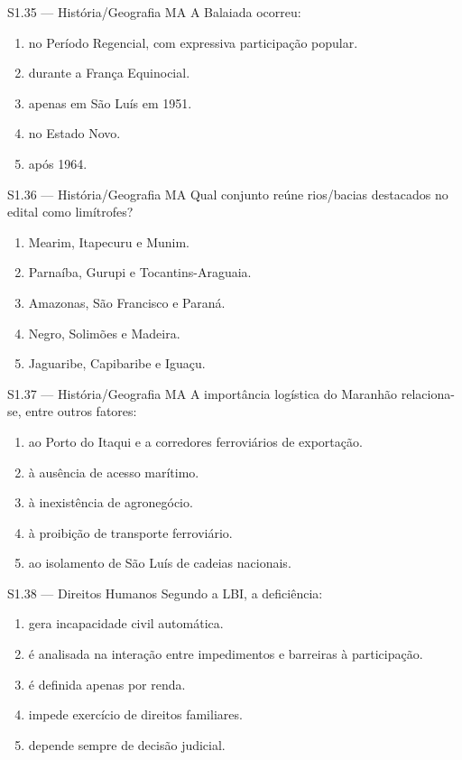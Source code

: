 \begin{questao}{S1.35 — História/Geografia MA}
A Balaiada ocorreu:
\begin{enumerate}[label=\Alph*)]
\item no Período Regencial, com expressiva participação popular.
\item durante a França Equinocial.
\item apenas em São Luís em 1951.
\item no Estado Novo.
\item após 1964.
\end{enumerate}
\end{questao}

\begin{questao}{S1.36 — História/Geografia MA}
Qual conjunto reúne rios/bacias destacados no edital como limítrofes?
\begin{enumerate}[label=\Alph*)]
\item Mearim, Itapecuru e Munim.
\item Parnaíba, Gurupi e Tocantins-Araguaia.
\item Amazonas, São Francisco e Paraná.
\item Negro, Solimões e Madeira.
\item Jaguaribe, Capibaribe e Iguaçu.
\end{enumerate}
\end{questao}

\begin{questao}{S1.37 — História/Geografia MA}
A importância logística do Maranhão relaciona-se, entre outros fatores:
\begin{enumerate}[label=\Alph*)]
\item ao Porto do Itaqui e a corredores ferroviários de exportação.
\item à ausência de acesso marítimo.
\item à inexistência de agronegócio.
\item à proibição de transporte ferroviário.
\item ao isolamento de São Luís de cadeias nacionais.
\end{enumerate}
\end{questao}

\begin{questao}{S1.38 — Direitos Humanos}
Segundo a LBI, a deficiência:
\begin{enumerate}[label=\Alph*)]
\item gera incapacidade civil automática.
\item é analisada na interação entre impedimentos e barreiras à participação.
\item é definida apenas por renda.
\item impede exercício de direitos familiares.
\item depende sempre de decisão judicial.
\end{enumerate}
\end{questao}

